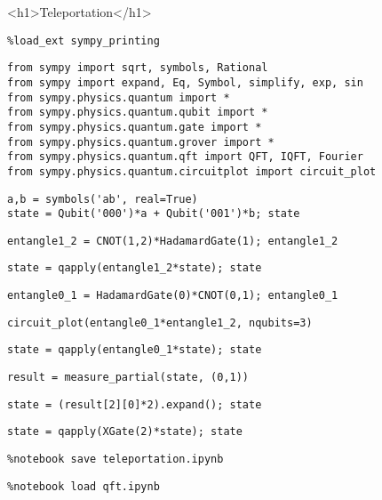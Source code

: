 <h1>Teleportation</h1>

\begin{verbatim}
%load_ext sympy_printing
\end{verbatim}

\begin{verbatim}
from sympy import sqrt, symbols, Rational
from sympy import expand, Eq, Symbol, simplify, exp, sin
from sympy.physics.quantum import *
from sympy.physics.quantum.qubit import *
from sympy.physics.quantum.gate import *
from sympy.physics.quantum.grover import *
from sympy.physics.quantum.qft import QFT, IQFT, Fourier
from sympy.physics.quantum.circuitplot import circuit_plot
\end{verbatim}

\begin{verbatim}
a,b = symbols('ab', real=True)
state = Qubit('000')*a + Qubit('001')*b; state
\end{verbatim}

\begin{verbatim}
entangle1_2 = CNOT(1,2)*HadamardGate(1); entangle1_2
\end{verbatim}

\begin{verbatim}
state = qapply(entangle1_2*state); state
\end{verbatim}

\begin{verbatim}
entangle0_1 = HadamardGate(0)*CNOT(0,1); entangle0_1
\end{verbatim}

\begin{verbatim}
circuit_plot(entangle0_1*entangle1_2, nqubits=3)
\end{verbatim}

\begin{verbatim}
state = qapply(entangle0_1*state); state
\end{verbatim}

\begin{verbatim}
result = measure_partial(state, (0,1))
\end{verbatim}

\begin{verbatim}
state = (result[2][0]*2).expand(); state
\end{verbatim}

\begin{verbatim}
state = qapply(XGate(2)*state); state
\end{verbatim}

\begin{verbatim}
%notebook save teleportation.ipynb
\end{verbatim}

\begin{verbatim}
%notebook load qft.ipynb
\end{verbatim}

